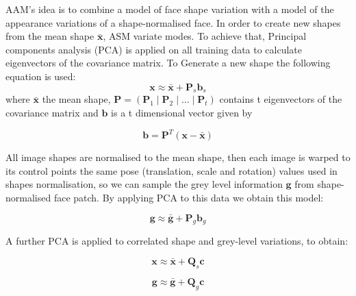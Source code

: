 AAM's idea is to combine a model of face shape variation with a model of the appearance variations of a shape-normalised face.
 In order to create new shapes from the mean shape $\boldsymbol{\bar{x}}$, ASM variate modes. To achieve that, Principal components analysis (PCA) is applied on all training data to calculate eigenvectors of the covariance matrix. To Generate a new shape the following equation is used:
\begin{equation}
\boldsymbol{x} \approx \boldsymbol{\bar{x}} + \boldsymbol{P}_s \boldsymbol{b}_s
    \label{equ:NewShapes}
\end{equation}
where $\boldsymbol{\bar{x}}$ the mean shape, $\boldsymbol{P}= (\boldsymbol{P}_1 \mid \boldsymbol{P}_2\mid...\mid \boldsymbol{P}_t)$  contains t eigenvectors of the covariance matrix and $\boldsymbol{b}$ is a t dimensional vector given by

\begin{equation}
\boldsymbol{b} = \boldsymbol{P}^T (\boldsymbol{x-\bar{x}})
    \label{equ:points}
\end{equation}
 
 All image shapes are normalised to the mean shape, then each image is warped to its control points the same pose (translation, scale and rotation) values used in shapes normalisation, so we can sample the grey level information $\boldsymbol{g}$ from shape-normalised face patch. By applying PCA to this data we obtain this model:
 

\begin{equation}
\boldsymbol{g} \approx \boldsymbol{\bar{g}} + \boldsymbol{P}_g \boldsymbol{b}_g
    \label{equ:NewGreys}
\end{equation}

A further PCA is applied to correlated shape and grey-level variations, to obtain:

\begin{equation}
\boldsymbol{x} \approx \boldsymbol{\bar{x}} + \boldsymbol{Q}_s \boldsymbol{c}
    \label{equ:ModelNewShapes}
\end{equation}

\begin{equation}
\boldsymbol{g} \approx \boldsymbol{\bar{g}} + \boldsymbol{Q}_g \boldsymbol{c}
    \label{equ:ModelNewShapes}
\end{equation}

